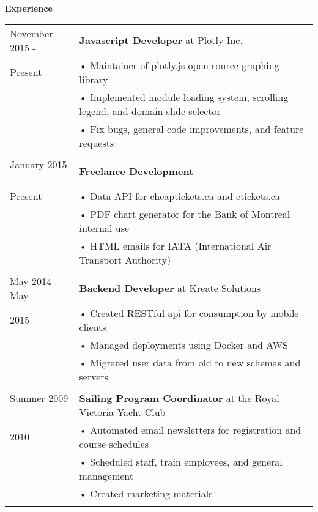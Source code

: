 \documentclass[notitlepage,oneside,draft]{article}
\begin{document}
\begin{flushleft}
  \large
  \textbf{Experience} \\
  \vspace{12pt}
  \normalsize
  \begin{tabular}{ p{86pt} | l}
    November 2015 - & \textbf{Javascript Developer} at Plotly Inc. \\
    Present & • Maintainer of plotly.js open source graphing library \\
    & • Implemented module loading system, scrolling legend, and domain slide selector \\
    & • Fix bugs, general code improvements, and feature requests \\
    & \\
    January 2015 - & \textbf{Freelance Development} \\
    Present & • Data API for cheaptickets.ca and etickets.ca \\
    & • PDF chart generator for the Bank of Montreal internal use \\
    & • HTML emails for IATA (International Air Transport Authority) \\
    & \\
    May 2014 - May & \textbf{Backend Developer} at Kreate Solutions \\
    2015 & • Created RESTful api for consumption by mobile clients \\
    & • Managed deployments using Docker and AWS \\
    & • Migrated user data from old to new schemas and servers \\
    & \\
    Summer 2009 - & \textbf{Sailing Program Coordinator} at the Royal Victoria Yacht Club \\
    2010 & • Automated email newsletters for registration and course schedules \\
    & • Scheduled staff, train employees, and general management \\
    & • Created marketing materials \\
    & \\
  \end{tabular}
  \vspace{24pt}



\end{flushleft}
\end{document}
